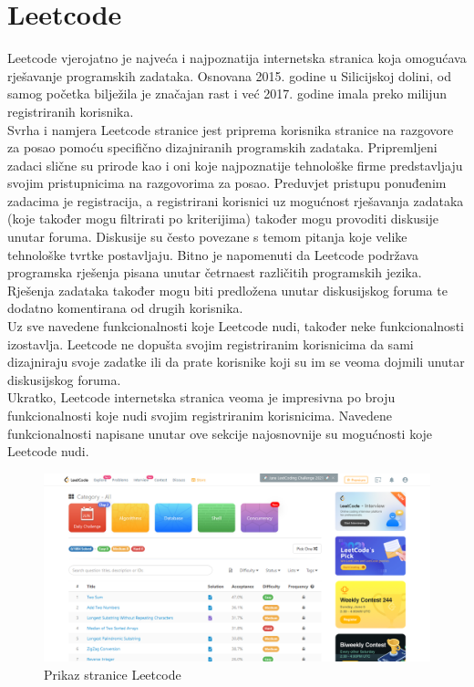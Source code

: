 \documentclass[times, utf8, zavrsni]{fer}
\begin{document}
		\section{Leetcode}
		Leetcode vjerojatno je najveća i najpoznatija internetska stranica koja omogućava rješavanje programskih zadataka. Osnovana 2015. godine u Silicijskoj dolini, od samog početka bilježila je značajan rast i već 2017. godine imala preko milijun registriranih korisnika.\\
		Svrha i namjera Leetcode stranice jest priprema korisnika stranice na razgovore za posao pomoću specifično dizajniranih programskih zadataka. Pripremljeni zadaci slične su prirode kao i oni koje najpoznatije tehnološke firme predstavljaju svojim pristupnicima na razgovorima za posao. Preduvjet pristupu ponuđenim zadacima je registracija, a registrirani korisnici uz mogućnost rješavanja zadataka (koje također mogu filtrirati po kriterijima) također mogu provoditi diskusije unutar foruma. Diskusije su često povezane s temom pitanja koje velike tehnološke tvrtke postavljaju. Bitno je napomenuti da Leetcode podržava programska rješenja pisana unutar četrnaest različitih programskih jezika. Rješenja zadataka također mogu biti predložena unutar diskusijskog foruma te dodatno komentirana od drugih korisnika.\\
		Uz sve navedene funkcionalnosti koje Leetcode nudi, također neke funkcionalnosti izostavlja. Leetcode ne dopušta svojim registriranim korisnicima da sami dizajniraju svoje zadatke ili da prate korisnike koji su im se veoma dojmili unutar diskusijskog foruma.\\
		Ukratko, Leetcode internetska stranica veoma je impresivna po broju funkcionalnosti koje nudi svojim registriranim korisnicima. Navedene funkcionalnosti napisane unutar ove sekcije najosnovnije su mogućnosti koje Leetcode nudi.
		\begin{figure}[H]
			\centering
			\includegraphics[width=\linewidth]{pictures/prikazi/Leetcode.png}
			\caption{Prikaz stranice Leetcode}
			\label{fig:leetcode}
		\end{figure}
	
\end{document}
